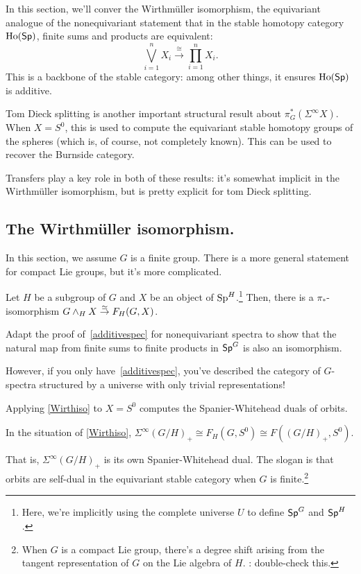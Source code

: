 In this section, we'll conver the Wirthmüller isomorphism, the equivariant analogue of the nonequivariant statement
that in the stable homotopy category $\operatorname{Ho}(\mathsf{Sp})$, finite sums and products are equivalent:
\begin{equation}
\label{additivespec}
\bigvee_{i=1}^n X_i\stackrel\cong\longrightarrow \prod_{i=1}^n X_i.
\end{equation}
This is a backbone of the stable category: among other things, it ensures $\operatorname{Ho}(\mathsf{Sp})$ is additive.

Tom Dieck splitting is another important structural result about $\pi_G^*(\Sigma^\infty X)$. When $X = S^0$, this
is used to compute the equivariant stable homotopy groups of the spheres (which is, of course, not completely
known). This can be used to recover the Burnside category.

Transfers play a key role in both of these results: it's somewhat implicit in the Wirthmüller isomorphism, but is
pretty explicit for tom Dieck splitting.
\subsection*{The Wirthmüller isomorphism.}
In this section, we assume $G$ is a finite group. There is a more general statement for compact Lie groups, but
it's more complicated.
\begin{thm}
\label{Wirthiso}
Let $H$ be a subgroup of $G$ and $X$ be an object of $\mathrm{Sp}^H$.\footnote{Here, we're implicitly using the complete
universe $U$ to define $\mathsf{Sp}^G$ and $\mathsf{Sp}^H$.} Then, there is a $\pi_*$-isomorphism
$G\wedge_H X\stackrel\simeq\to F_H(G,X)$.
\end{thm}
\begin{ex}
Adapt the proof of~\eqref{additivespec} for nonequivariant spectra to show that the natural map from finite sums to
finite products in $\mathsf{Sp}^G$ is also an isomorphism.
\end{ex}
However, if you only have~\eqref{additivespec}, you've described the category of $G$-spectra structured by a
universe with only trivial representations!

Applying \cref{Wirthiso} to $X = S^0$ computes the Spanier-Whitehead duals of orbits.
\begin{cor}
\label{wirthcor}
In the situation of \cref{Wirthiso}, $\Sigma^\infty(G/H)_+\cong F_H(G,S^0)\cong F((G/H)_+, S^0)$.
\end{cor}
That is, $\Sigma^\infty (G/H)_+$ is its own Spanier-Whitehead dual. The slogan is that orbits are self-dual in the
equivariant stable category when $G$ is finite.\footnote{When $G$ is a compact Lie group, there's a degree shift
arising from the tangent representation of $G$ on the Lie algebra of $H$. \TODO: double-check
this.}

